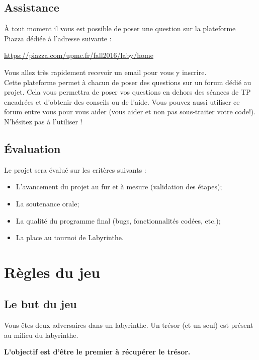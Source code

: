 \documentclass[french,12pt,a4paper,twoside,openright,titlepage]{report}
\begin{document}
\subsection{Assistance}
À tout moment il vous est possible de poser une question sur la plateforme Piazza dédiée à l'adresse suivante :
\begin{center}
\url{https://piazza.com/upmc.fr/fall2016/laby/home}
\end{center}
Vous allez très rapidement recevoir un email pour vous y inscrire.\\
Cette plateforme permet à chacun de poser des questions sur un forum dédié au projet. Cela vous permettra de poser vos questions en dehors des séances de TP encadrées et d'obtenir des conseils ou de l'aide. Vous pouvez aussi utiliser ce forum entre vous pour vous aider (vous aider et non pas sous-traiter votre code!). N'hésitez pas à l'utiliser !


\subsection{Évaluation}
Le projet sera évalué sur les critères suivants : 
\begin{itemize}
\item L'avancement du projet au fur et à mesure (validation des étapes);
\item La soutenance orale;
\item La qualité du programme final (bugs, fonctionnalités codées, etc.);
\item La place au tournoi de Labyrinthe.
\end{itemize}

\section{Règles du jeu}
\subsection{Le but du jeu}
Vous êtes deux adversaires dans un labyrinthe. Un trésor (et un seul)
est présent au milieu du labyrinthe.

\textbf{L'objectif est d'être le premier à récupérer le trésor.}
\end{document}
